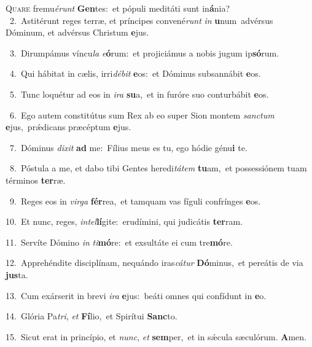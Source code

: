 \lettrine{\initial\textcolor{\initialcolor}{Q}}{uare} fremu\-\textit{é}\-\textit{runt} \textbf{Gen}\-tes:~\star et pópuli meditáti sunt in\-\textbf{á}\-nia?\\
{\numbfont\textcolor{\numbcolor}{~2.}}~Astitérunt reges terræ, et príncipes convené\textit{runt} \textit{in} \textbf{u}\-num~\star advérsus Dóminum, et advérsus Christum \textbf{e}\-jus.\par
{\numbfont\textcolor{\numbcolor}{~3.}}~Dirumpámus víncu\textit{la} \textit{e}\-\textbf{ó}rum:~\star et projiciámus a nobis jugum ip\-\textbf{só}\-rum.\par
{\numbfont\textcolor{\numbcolor}{~4.}}~Qui hábitat in cælis, irri\-\textit{dé}\-\textit{bit} \textbf{e}\-os:~\star et Dóminus subsannábit \textbf{e}\-os.\par
{\numbfont\textcolor{\numbcolor}{~5.}}~Tunc loquétur ad eos in \textit{i}\-\textit{ra} \textbf{su}\-a,~\star et in furóre suo conturbábit \textbf{e}\-os.\par
{\numbfont\textcolor{\numbcolor}{~6.}}~Ego autem constitútus sum Rex ab eo super Sion montem \textit{sanc}\-\textit{tum} \textbf{e}\-jus,~\star prǽdicans præcéptum \textbf{e}\-jus.\par
{\numbfont\textcolor{\numbcolor}{~7.}}~Dóminus \textit{di}\-\textit{xit} \textbf{ad} me:~\star Fílius meus es tu, ego hódie génu\textbf{i} te.\par
{\numbfont\textcolor{\numbcolor}{~8.}}~Póstula a me, et dabo tibi Gentes heredi\-\textit{tá}\-\textit{tem} \textbf{tu}\-am,~\star et possessiónem tuam términos \textbf{ter}\-ræ.\par
{\numbfont\textcolor{\numbcolor}{~9.}}~Reges eos in \textit{vir}\-\textit{ga} \textbf{fér}\-rea,~\star et tamquam vas fíguli confrínges \textbf{e}\-os.\par
{\numbfont\textcolor{\numbcolor}{10.}}~Et nunc, reges, \textit{in}\-\textit{tel}\textbf{lí}gite:~\star erudímini, qui judicátis \textbf{ter}\-ram.\par
{\numbfont\textcolor{\numbcolor}{11.}}~Servíte Dómino \textit{in} \textit{ti}\-\textbf{mó}re:~\star et exsultáte ei cum tre\-\textbf{mó}\-re.\par
{\numbfont\textcolor{\numbcolor}{12.}}~Apprehéndite disciplínam, nequándo iras\-\textit{cá}\-\textit{tur} \textbf{Dó}\-minus,~\star et pereátis de via \textbf{jus}\-ta.\par
{\numbfont\textcolor{\numbcolor}{13.}}~Cum exárserit in brevi \textit{i}\-\textit{ra} \textbf{e}\-jus:~\star beáti omnes qui confídunt in \textbf{e}\-o.\par
{\numbfont\textcolor{\numbcolor}{14.}}~Glória Pa\-\textit{tri}\-, \textit{et} \textbf{Fí}\-lio,~\star et Spirítui \textbf{Sanc}\-to.\par
{\numbfont\textcolor{\numbcolor}{15.}}~Sicut erat in princípio, et \textit{nunc}\-, \textit{et} \textbf{sem}\-per,~\star et in sǽcula sæculórum. \textbf{A}\-men.\par
